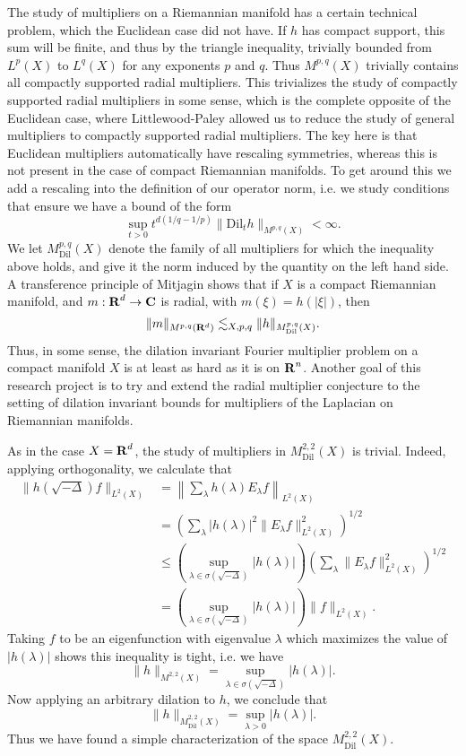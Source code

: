 The study of multipliers on a Riemannian manifold has a certain technical problem, which the Euclidean case did not have. If $h$ has compact support, this sum will be finite, and thus by the triangle inequality, trivially bounded from $L^p(X)$ to $L^q(X)$ for any exponents $p$ and $q$. Thus $M^{p,q}(X)$ trivially contains all compactly supported radial multipliers. This trivializes the study of compactly supported radial multipliers in some sense, which is the complete opposite of the Euclidean case, where Littlewood-Paley allowed us to reduce the study of general multipliers to compactly supported radial multipliers. The key here is that Euclidean multipliers automatically have rescaling symmetries, whereas this is not present in the case of compact Riemannian manifolds. To get around this we add a rescaling into the definition of our operator norm, i.e. we study conditions that ensure we have a bound of the form
%
\[ \sup_{t > 0} t^{d(1/q - 1/p)} \| \text{Dil}_t h \|_{M^{p,q}(X)} < \infty. \]
%
We let $M^{p,q}_{\text{Dil}}(X)$ denote the family of all multipliers for which the inequality above holds, and give it the norm induced by the quantity on the left hand side. A transference principle of Mitjagin \cite{Mitjagin} shows that if $X$ is a compact Riemannian manifold, and $m: \operatorname{\mathbf{R}}^d \to \operatorname{\mathbf{C}}$ is radial, with $m(\xi) = h(|\xi|)$, then
%
\[ \| m \|_{M^{p,q}(\operatorname{\mathbf{R}}^d)} \lesssim_{X,p,q} \| h \|_{M^{p,q}_{\text{Dil}}(X)}. \]
%
Thus, in some sense, the dilation invariant Fourier multiplier problem on a compact manifold $X$ is at least as hard as it is on $\operatorname{\mathbf{R}}^n$. Another goal of this research project is to try and extend the radial multiplier conjecture to the setting of dilation invariant bounds for multipliers of the Laplacian on Riemannian manifolds.

As in the case $X = \operatorname{\mathbf{R}}^d$, the study of multipliers in $M^{2,2}_{\text{Dil}}(X)$ is trivial. Indeed, applying orthogonality, we calculate that
%
\begin{align*}
    \| h(\sqrt{-\Delta}) f \|_{L^2(X)} &= \left\| \sum_\lambda h(\lambda) E_\lambda f \right\|_{L^2(X)}\\
    &= \left( \sum_\lambda |h(\lambda)|^2 \| E_\lambda f \|_{L^2(X)}^2 \right)^{1/2}\\
    &\leq \left( \sup_{\lambda \in \sigma(\sqrt{-\Delta})} |h(\lambda)| \right) \left( \sum_\lambda \| E_\lambda f \|_{L^2(X)}^2 \right)^{1/2}\\
    &= \left( \sup_{\lambda \in \sigma(\sqrt{-\Delta})} |h(\lambda)| \right) \| f \|_{L^2(X)}.
\end{align*}
%
Taking $f$ to be an eigenfunction with eigenvalue $\lambda$ which maximizes the value of $|h(\lambda)|$ shows this inequality is tight, i.e. we have
%
\[ \| h \|_{M^{2,2}(X)} = \sup_{\lambda \in \sigma(\sqrt{-\Delta})} |h(\lambda)|. \]
%
Now applying an arbitrary dilation to $h$, we conclude that
%
\[ \| h \|_{M^{2,2}_{\text{Dil}} (X)} = \sup_{\lambda > 0} |h(\lambda)|. \]
%
Thus we have found a simple characterization of the space $M^{2,2}_{\text{Dil}}(X)$.

